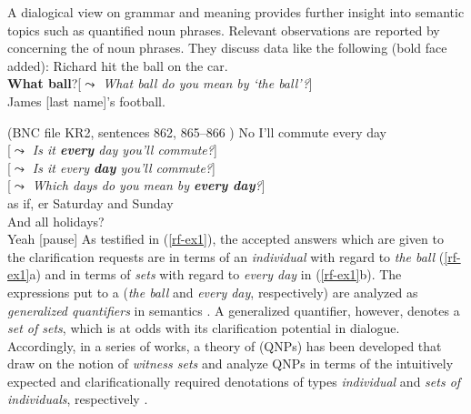 \documentclass[output=paper,biblatex,babelshorthands,newtxmath,draftmode,colorlinks,citecolor=brown]{langscibook}
\begin{document}
A dialogical view on grammar and meaning provides further insight into semantic topics such as quantified noun phrases.
%
Relevant observations are reported by \citet{Purver:Ginzburg:2004} concerning the  of noun phrases.
%
They discuss data like the following (bold face added):
%
\ea \label{rf-ex1}
  \ea  {} Richard hit the ball on the car. \\
 \textbf{What ball}?\hspace*{0.25cm}[\emph{$\leadsto$ What ball do you mean by  `the ball'?}] \\
 James [last name]'s football. \par\smallskip
\hfill (BNC file KR2, sentences 862, 865--866 )
  \ex {} No I'll commute every day \\
 [\emph{$\leadsto$ Is it \textbf{every} day you'll commute?}]\\
 [\emph{$\leadsto$ Is it every \textbf{day} you'll commute?}]\\
 [\emph{$\leadsto$ Which days do you mean by \textbf{every day}?}]\\
 as if, er Saturday and Sunday \\
 And all holidays? \\
 Yeah [pause]
  \z
\z
%
As testified in (\ref{rf-ex1}), the accepted answers which are given to the clarification requests are in terms of an \emph{individual} with regard to \textit{the ball} (\ref{rf-ex1}a) and in terms of \emph{sets} with regard to \textit{every day} in (\ref{rf-ex1}b).
%
The expressions put to a  (\textit{the ball} and \textit{every day}, respectively) are analyzed as \emph{generalized quantifiers} in semantics \citep{montague73}.
%
A generalized quantifier, however, denotes a \emph{set of sets}, which is at odds with its clarification potential in dialogue. 
%
Accordingly, in a series of works, a theory of  (QNPs) has been developed that draw on the notion of \emph{witness sets} \citep[]{Barwise:Cooper:1981} and analyze QNPs in terms of the intuitively expected and clarificationally required denotations of types \emph{individual} and \emph{sets of individuals}, respectively  \citep{Purver:Ginzburg:2004,Ginzburg:Purver:2012,Ginzburg:2012,Cooper:2013,Luecking:Ginzburg:2018,Cooper:ms}. 
%
\end{document}
